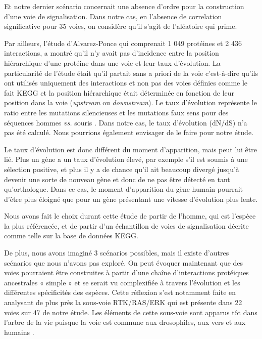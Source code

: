 \par Et notre dernier scénario concernait une absence d’ordre pour la construction d’une voie de signalisation. Dans notre cas, en l'absence de correlation significative pour 35 voies, on considère qu'il s'agit de l'aléatoire qui prime. 
\par Par ailleurs, l’étude d’Alvarez-Ponce qui comprenait 1 049 protéines et 2 436 interactions, a montré qu’il n’y avait pas d’incidence entre la position hiérarchique d’une protéine dans une voie et leur taux d’évolution. La particularité de l’étude était qu’il partait sans a priori de la voie c’est-à-dire qu’ils ont utilisés uniquement des interactions et non pas des voies définies comme le fait KEGG et la position hiérarchique était déterminée en fonction de leur position dans la voie (\textit{upstream} ou \textit{downstream}). Le taux d’évolution représente le ratio entre les mutations silencieuses et les mutations faux sens pour des séquences hommes \textit{vs.} souris \parencite{alvarez-ponce_relationship_2012}. Dans notre cas, le taux d’évolution (dN/dS) n’a pas été calculé. Nous pourrions également envisager de le faire pour notre étude.
\par Le taux d’évolution est donc différent du moment d’apparition, mais peut lui être lié. Plus un gène a un taux d’évolution élevé, par exemple s’il est soumis à une sélection positive, et plus il y a de chance qu’il ait beaucoup divergé jusqu’à devenir une sorte de nouveau gène et donc de ne pas être détecté en tant qu’orthologue. Dans ce cas, le moment d’apparition du gène humain pourrait d’être plus éloigné que pour un gène présentant une vitesse d’évolution plus lente. 
\par Nous avons fait le choix durant cette étude de partir de l’homme, qui est l’espèce la plus référencée, et de partir d’un échantillon de voies de signalisation décrite comme telle sur la base de données KEGG. 
\par De plus, nous avons imaginé 3 scénarios possibles, mais il existe d’autres scénarios que nous n'avons pas exploré. On peut évoquer maintenant que des voies pourraient être construites à partir d’une chaîne d’interactions protéiques ancestrales « simple » et se serait vu complexifiée à travers l’évolution et les différentes spécificités des espèces. Cette réflexion s’est notamment faite en analysant de plus près la sous-voie RTK/RAS/ERK qui est présente dans 22 voies sur 47 de notre étude. Les éléments de cette sous-voie sont apparus tôt dans l’arbre de la vie puisque la voie est commune aux drosophiles, aux vers et aux humains \parencite{ashton-beaucage_signalisation_2010}. 
